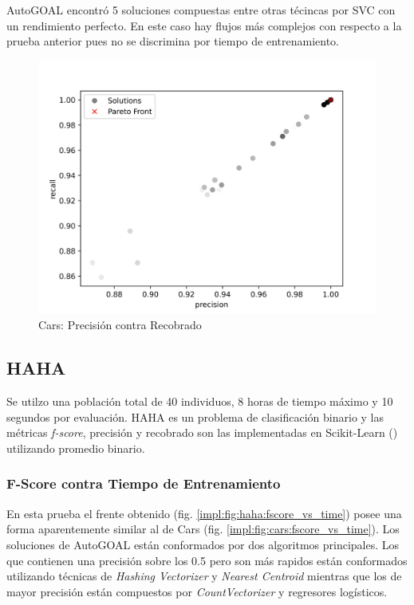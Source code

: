 AutoGOAL encontr\'o 5 soluciones compuestas entre otras t\'ecincas por SVC con un rendimiento perfecto. En este caso hay flujos m\'as complejos con respecto a la prueba anterior pues no se discrimina por tiempo de entrenamiento.

\begin{figure}[ht]
    \centering
    \includegraphics[scale=0.65]{Pictures/cars_precision_vs_recall.jpg}
    \caption{Cars: Precisi\'on contra Recobrado}
    \label{impl:fig:cars:precision_vs_recall}
\end{figure}

\subsection{HAHA}
Se utilzo una poblaci\'on total de 40 individuos, 8 horas de tiempo m\'aximo y 10 segundos por  evaluaci\'on. 
HAHA es un problema de clasificaci\'on binario y las m\'etricas \textit{f-score}, precisi\'on y recobrado son las implementadas en Scikit-Learn (\cite{pedregosa2011scikit}) utilizando promedio binario.

\subsubsection{F-Score contra Tiempo de Entrenamiento}

En esta prueba el frente obtenido (fig. \ref{impl:fig:haha:fscore_vs_time}) posee una forma aparentemente similar al de Cars (fig. \ref{impl:fig:cars:fscore_vs_time}). Los soluciones de AutoGOAL  est\'an conformados por dos algoritmos principales. Los que contienen una precisi\'on sobre los 0.5 pero son m\'as rapidos est\'an conformados utilizando t\'ecnicas de \textit{Hashing Vectorizer} y \textit{Nearest Centroid} mientras que los de mayor precisi\'on est\'an compuestos por \textit{CountVectorizer}  y regresores log\'isticos.

